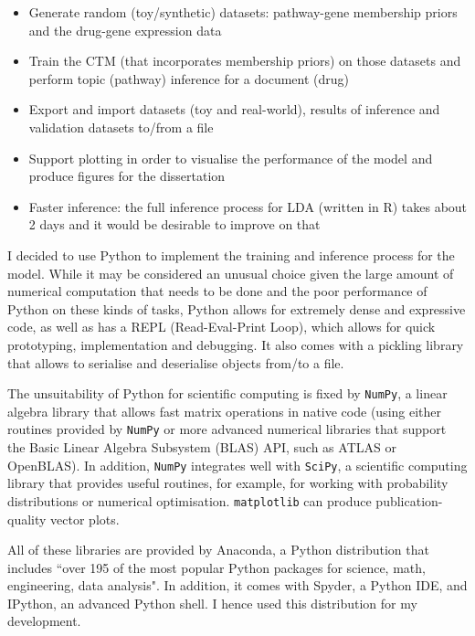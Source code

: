 \documentclass[12pt,a4paper,twoside,openright]{report}
\begin{document}
\begin{itemize}[noitemsep]
\item Generate random (toy/synthetic) datasets: pathway-gene membership priors and the drug-gene expression data
\item Train the CTM (that incorporates membership priors) on those datasets and perform topic (pathway) inference for a document (drug)
\item Export and import datasets (toy and real-world), results of inference and validation datasets to/from a file
\item Support plotting in order to visualise the performance of the model and produce figures for the dissertation
\item Faster inference: the full inference process for LDA (written in R) takes about 2 days and it would be desirable to improve on that
\end{itemize}

I decided to use Python to implement the training and inference process for the model. While it may be considered an unusual choice given the large amount of numerical computation that needs to be done and the poor performance of Python on these kinds of tasks, Python allows for extremely dense and expressive code, as well as has a REPL (Read-Eval-Print Loop), which allows for quick prototyping, implementation and debugging. It also comes with a pickling library that allows to serialise and deserialise objects from/to a file. 

The unsuitability of Python for scientific computing is fixed by \texttt{NumPy}\cite{DBLP:journals/corr/abs-1102-1523}, a linear algebra library that allows fast matrix operations in native code (using either routines provided by \texttt{NumPy} or more advanced numerical libraries that support the Basic Linear Algebra Subsystem (BLAS) API, such as ATLAS or OpenBLAS). In addition, \texttt{NumPy} integrates well with \texttt{SciPy}, a scientific computing library that provides useful routines, for example, for working with probability distributions or numerical optimisation. \texttt{matplotlib} can produce publication-quality vector plots.

All of these libraries are provided by Anaconda, a Python distribution that includes ``over 195 of the most popular Python packages for science, math, engineering, data analysis". In addition, it comes with Spyder, a Python IDE, and IPython, an advanced Python shell. I hence used this distribution for my development.
\end{document}
